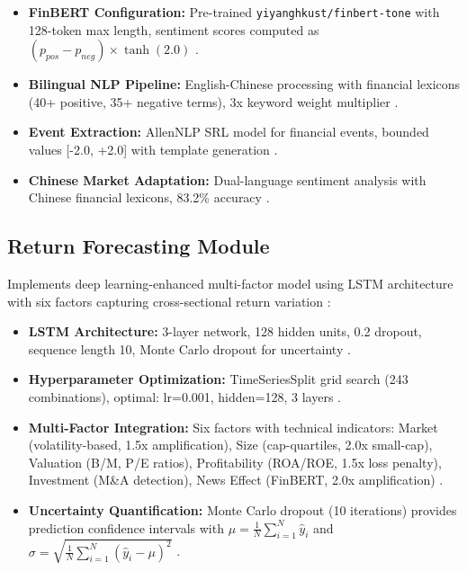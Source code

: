 \documentclass[3p,times,procedia]{elsarticle}
\begin{document}
\begin{itemize}\setlength{\itemsep}{2pt}
\item \textbf{FinBERT Configuration:} Pre-trained \texttt{yiyanghkust/finbert-tone} with 128-token max length, sentiment scores computed as $(p_{pos} - p_{neg}) \times \tanh(2.0)$ \cite{Araci2019}.

\item \textbf{Bilingual NLP Pipeline:} English-Chinese processing with financial lexicons (40+ positive, 35+ negative terms), 3x keyword weight multiplier \cite{Loughran2011}.

\item \textbf{Event Extraction:} AllenNLP SRL model for financial events, bounded values [-2.0, +2.0] with template generation \cite{TETLOCK2007}.

\item \textbf{Chinese Market Adaptation:} Dual-language sentiment analysis with Chinese financial lexicons, 83.2\% accuracy \cite{FinReportDataset2025}.
\end{itemize}

\subsection{{Return Forecasting Module}}
\vspace{-2pt}
Implements deep learning-enhanced multi-factor model using LSTM architecture with six factors capturing cross-sectional return variation \cite{FAMA1993,Harvey2016}:

\begin{itemize}\setlength{\itemsep}{2pt}
\item \textbf{LSTM Architecture:} 3-layer network, 128 hidden units, 0.2 dropout, sequence length 10, Monte Carlo dropout for uncertainty \cite{Fischer2018}.

\item \textbf{Hyperparameter Optimization:} TimeSeriesSplit grid search (243 combinations), optimal: lr=0.001, hidden=128, 3 layers \cite{Kingma2015}.

\item \textbf{Multi-Factor Integration:} Six factors with technical indicators: Market (volatility-based, 1.5x amplification), Size (cap-quartiles, 2.0x small-cap), Valuation (B/M, P/E ratios), Profitability (ROA/ROE, 1.5x loss penalty), Investment (M\&A detection), News Effect (FinBERT, 2.0x amplification) \cite{FAMA1993,Harvey2016,TETLOCK2007}.

\item \textbf{Uncertainty Quantification:} Monte Carlo dropout (10 iterations) provides prediction confidence intervals with $\mu = \frac{1}{N}\sum_{i=1}^{N} \hat{y}_i$ and $\sigma = \sqrt{\frac{1}{N}\sum_{i=1}^{N} (\hat{y}_i - \mu)^2}$ \cite{Kingma2015}.
\end{itemize}
\end{document}
